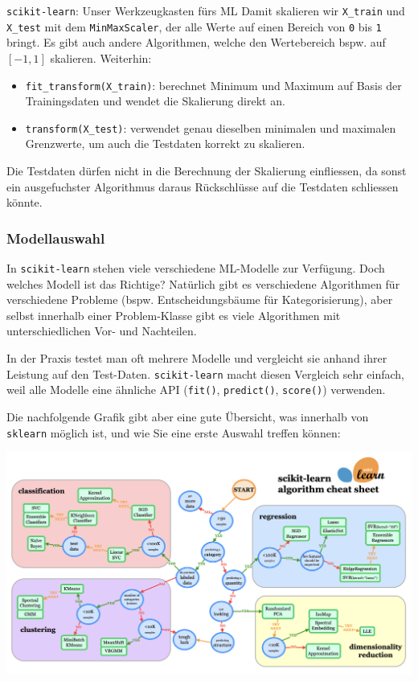 \begin{lpu}{\texttt{scikit-learn}: Unser Werkzeugkasten fürs ML}
Damit skalieren wir \texttt{X\_train} und \texttt{X\_test} mit dem \texttt{MinMaxScaler}, der alle Werte auf einen Bereich von \texttt{0} bis \texttt{1} bringt. Es gibt auch andere Algorithmen, welche den Wertebereich bspw. auf $[-1,1]$ skalieren. Weiterhin:

\begin{itemize}
  \item \texttt{fit\_transform(X\_train)}: berechnet Minimum und Maximum auf Basis der Trainingsdaten und wendet die Skalierung direkt an.
  \item \texttt{transform(X\_test)}: verwendet genau dieselben minimalen und maximalen Grenzwerte, um auch die Testdaten korrekt zu skalieren.
\end{itemize}

Die Testdaten dürfen nicht in die Berechnung der Skalierung einfliessen, da sonst ein ausgefuchster Algorithmus daraus Rückschlüsse auf die Testdaten schliessen könnte.


\subsubsection*{Modellauswahl}

In \texttt{scikit-learn} stehen viele verschiedene ML-Modelle zur Verfügung. Doch welches Modell ist das Richtige? Natürlich gibt es verschiedene Algorithmen für verschiedene Probleme (bspw. Entscheidungsbäume für Kategorisierung), aber selbst innerhalb einer Problem-Klasse gibt es viele Algorithmen mit unterschiedlichen Vor- und Nachteilen.

In der Praxis testet man oft mehrere Modelle und vergleicht sie anhand ihrer Leistung auf den Test-Daten. \texttt{scikit-learn} macht diesen Vergleich sehr einfach, weil alle Modelle eine ähnliche API (\texttt{fit()}, \texttt{predict()}, \texttt{score()}) verwenden.

Die nachfolgende Grafik gibt aber eine gute Übersicht, was innerhalb von \texttt{sklearn} möglich ist, und wie Sie eine erste Auswahl treffen können:

\begin{center}
  \includegraphics[width=0.9\linewidth]{algos.png}
\end{center}


\end{lpu}
